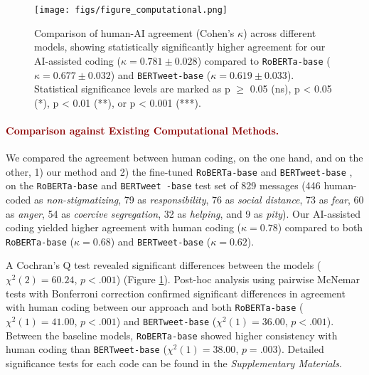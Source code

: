 \begin{figure}
    \centering
    \texttt{[image: figs/figure\_computational.png]}
    \caption{Comparison of human-AI agreement (Cohen's $\kappa$) across different models, showing statistically significantly higher agreement for our AI-assisted coding ($\kappa = 0.781 \pm 0.028$) compared to \texttt{RoBERTa-base} ($\kappa = 0.677 \pm 0.032$) and \texttt{BERTweet-base} ($\kappa = 0.619 \pm 0.033$). Statistical significance levels are marked as p $\geq$ 0.05 (ns), p < 0.05 (*), p < 0.01 (**), or p < 0.001 (***).}
    \label{fig:computational}
\end{figure}



\paragraph{\textcolor{darkred}{\textbf{Comparison against Existing Computational Methods.}}}

We compared the agreement between human coding, on the one hand, and on the other, 1) our method and 2) the fine-tuned \texttt{RoBERTa-base} \cite{roberta_liu_2019} and \texttt{BERTweet-base} \cite{bertweet_nguyen_2020}, on the \texttt{RoBERTa-base} and \texttt{BERTweet -base} test set of 829 messages (446 human-coded as \textit{non-stigmatizing}, 79 as \textit{responsibility}, 76 as \textit{social distance}, 73 as \textit{fear}, 60 as \textit{anger}, 54 as \textit{coercive segregation}, 32 as \textit{helping}, and 9 as \textit{pity}). 
Our AI-assisted coding yielded higher agreement with human coding ($\kappa = 0.78$) compared to both \texttt{RoBERTa-base} ($\kappa = 0.68$) and \texttt{BERTweet-base} ($\kappa = 0.62$).

A Cochran's Q test revealed significant differences between the models ($\chi^2(2) = 60.24$, $p < .001$) (Figure \ref{fig:computational}). 
Post-hoc analysis using pairwise McNemar tests with Bonferroni correction confirmed significant differences in agreement with human coding between our approach and both \texttt{RoBERTa-base} ($\chi^2(1) = 41.00$, $p < .001$) and \texttt{BERTweet-base} ($\chi^2(1) = 36.00$, $p < .001$).
Between the baseline models, \texttt{RoBERTa-base} showed higher consistency with human coding than \texttt{BERTweet-base} ($\chi^2(1) = 38.00$, $p = .003$).
Detailed significance tests for each code can be found in the \textit{Supplementary Materials}.

